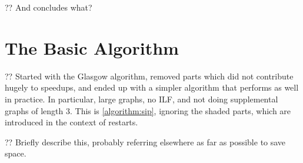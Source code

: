 \documentclass{article}
\begin{document}
?? And concludes what?

\section{The Basic Algorithm}

?? Started with the Glasgow algorithm, removed parts which did not contribute hugely to speedups,
and ended up with a simpler algorithm that performs as well in practice. In particular, large
graphs, no ILF, and not doing supplemental graphs of length 3. This is \cref{algorithm:sip},
ignoring the shaded parts, which are introduced in the context of restarts.

?? Briefly describe this, probably referring elsewhere as far as possible to save space.

\newcommand{\siplabel}[1]{\label{line:sip:#1}}
\newcommand{\siplineref}[1]{line~\ref{line:sip:#1}}
\end{document}
